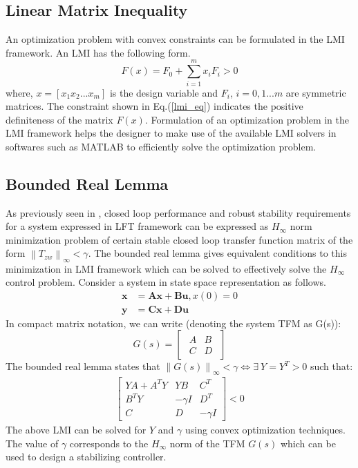 \documentclass[a4paper,12pt]{article}
\newcommand\norm[1]{\left\lVert#1\right\rVert}
\begin{document}
	\subsection{Linear Matrix Inequality}
	An optimization problem with convex constraints can be formulated in the LMI framework. An LMI has the following form.
		\begin{equation}
			\label{lmi_eq}
			F(x)=F_{0}+\sum_{i=1}^{m}x_{i}F_{i} > 0
		\end{equation}
		where, $x=[x_{1} x_{2} ... x_{m}]$ is the design variable and $F_{i}$, $i=0,1...m$ are symmetric matrices. The constraint shown in Eq.(\ref{lmi_eq}) indicates the positive definiteness of the matrix $F(x)$. Formulation of an optimization problem in the LMI framework helps the designer to make use of the available LMI solvers in softwares such as MATLAB to efficiently solve the optimization problem.
	\subsection{Bounded Real Lemma}
	As previously seen in \cite{prev}, closed loop performance and robust stability requirements for a system expressed in LFT framework can be expressed as $H_{\infty}$ norm minimization problem of certain stable closed loop transfer function matrix of the form $\norm{T_{zw}}_{\infty} < \gamma$. 
	The bounded real lemma gives equivalent conditions to this minimization in LMI framework which can be solved to effectively solve the $H_{\infty}$ control problem. Consider a system in state space representation as follows.
	\begin{align}
	\label{ss}
		\textbf{\.x}&=\textbf{Ax} + \textbf{Bu}, x(0)=0\\
		\textbf{y}&=\textbf{Cx} + \textbf{Du}
		\end{align}
		In compact matrix notation, we can write (denoting the system TFM as G(s)):
		\[G(s)=\begin{bmatrix}
		\begin{array}{c|c}
		A & B \\\hline C & D
		\end{array}
		\end{bmatrix}
		\]
		The bounded real lemma states that 
		$\norm{G(s)}_{\infty}<\gamma \Leftrightarrow \exists \: Y = Y^{T} > 0$ such that:
		\begin{align}
		\label{brl_lmi}
		\begin{bmatrix}
		YA+A^{T}Y & YB & C^{T} \\
		B^{T}Y & -\gamma I & D^{T}\\
		C & D & -\gamma I
		\end{bmatrix}
		< 0
		\end{align}
		The above LMI can be solved for $Y$ and $\gamma$ using convex optimization techniques. The value of $\gamma$ corresponds to the $H_{\infty}$ norm of the TFM $G(s)$ which can be used to design a stabilizing controller. 
\end{document}
